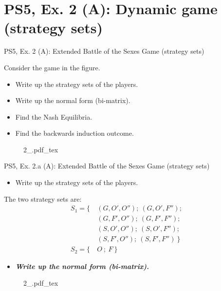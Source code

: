 \section{PS5, Ex. 2 (A): Dynamic game (strategy sets)}

\begin{frame}{PS5, Ex. 2 (A): Extended Battle of the Sexes Game (strategy sets)}
  \begin{multicols}{2}
    Consider the game in the figure.
    \begin{itemize}
      \item[(a)] Write up the strategy sets of the players.
      \item[(b)] Write up the normal form (bi-matrix).
      \item[(c)] Find the Nash Equilibria.
      \item[(d)] Find the backwards induction outcome.
    \end{itemize}
    \vfill\null \columnbreak
    \begin{figure}[!h]
      \center
      \def\svgwidth{\columnwidth}
      {2_.pdf_tex}
    \end{figure}
    \vfill\null
  \end{multicols}
\end{frame}

\begin{frame}{PS5, Ex. 2.a (A): Extended Battle of the Sexes Game (strategy sets)}
  \begin{multicols}{2}
    \begin{itemize}
      \item[(a)] Write up the strategy sets of the players.
    \end{itemize}
    The two strategy sets are:
    \begin{align*}
      S_1=\{\ &(G, O', O'');\ (G, O', F'');\\
              &(G, F', O'');\ (G, F', F'');\\
              &(S, O', O'');\ (S, O', F'');\\
              &(S, F', O'');\ (S, F', F'')\ \}\\
      S_2=\{\ &O\ ;\ F\ \}
    \end{align*}
    \begin{itemize}
      \item[(b)] \textbf{\textit{Write up the normal form (bi-matrix).}}
    \end{itemize}
    \vfill\null \columnbreak
    \begin{figure}[!h]
      \center
      \def\svgwidth{\columnwidth}
      {2_.pdf_tex}
    \end{figure}
    \vfill\null
  \end{multicols}
\end{frame}

